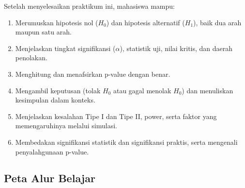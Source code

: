 \documentclass[
  indonesian,
  letterpaper,
]{book}
\providecommand{\tightlist}{%
  \setlength{\itemsep}{0pt}\setlength{\parskip}{0pt}}
\begin{document}
Setelah menyelesaikan praktikum ini, mahasiswa mampu:

\begin{enumerate}
\def\labelenumi{\arabic{enumi}.}
\tightlist
\item
  Merumuskan hipotesis nol (\(H_0\)) dan hipotesis alternatif (\(H_1\)),
  baik dua arah maupun satu arah.
\item
  Menjelaskan tingkat signifikansi (\(\alpha\)), statistik uji, nilai
  kritis, dan daerah penolakan.
\item
  Menghitung dan menafsirkan p-value dengan benar.
\item
  Mengambil keputusan (tolak \(H_0\) atau gagal menolak \(H_0\)) dan
  menuliskan kesimpulan dalam konteks.
\item
  Menjelaskan kesalahan Tipe I dan Tipe II, power, serta faktor yang
  memengaruhinya melalui simulasi.
\item
  Membedakan signifikansi statistik dan signifikansi praktis, serta
  mengenali penyalahgunaan p-value.
\end{enumerate}

\subsection{Peta Alur Belajar}\label{peta-alur-belajar-1}
\end{document}
